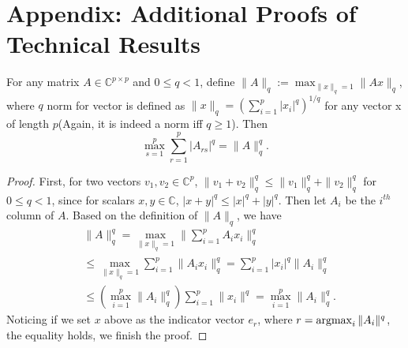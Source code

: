 \section{Appendix: Additional Proofs of Technical Results}\label{Appendix:proof_technical_lemmas}
\label{sec:proof_for_technical_lemmas}

\begin{lem}
\label{lemma:q_norm_eq}
For any matrix $A\in \mathbb{C}^{p \times p}$ and  $0\le q<1$, define $\|A\|_q:= \max_{\|x\|_q=1} \|Ax\|_q$, where $q$ norm for vector is defined as $\|x\|_q= (\sum_{i=1}^p |x_i|^q)^{1/q}$ for any vector x of length $p$(Again, it is indeed a norm iff $q\ge 1$). Then 
\begin{equation}
\max_{s=1}^p  \sum_{r=1}^p |A_{rs}|^q = \|A\|_q^q. \nonumber
\end{equation}
\begin{proof}
First, for two vectors $v_1, v_2\in \mathbb{C}^p$, $\|v_1+v_2\|_q^q\le \|v_1\|_q^q + \|v_2\|_q^q$ for $0\le q<1$, since for scalars $x,y\in \mathbb{C}$, $|x+y|^q \le |x|^q+|y|^q$. Then let $A_i$ be the $i^{th}$ column of $A$. Based on the definition of $\|A\|_q$, we have 
\begin{equation*}
\begin{aligned}
& \|A\|_q^q = \max_{\|x\|_q = 1} \|\sum_{i=1}^p A_ix_i\|_q^q \\
& \le  \max_{\|x\|_q = 1} \sum_{i=1}^p \|A_ix_i\|_q^q  = \sum_{i=1}^p |x_i|^q\|A_i\|_q^q\\
&\le (\max_{i=1}^p \|A_i\|_q^q) \sum_{i=1}^p\|x_i\|^q = \max_{i=1}^p \|A_i\|_q^q.
\end{aligned}
\end{equation*}
Noticing if we set $x$ above as the indicator vector $e_r$, where $r=\argmax_i \|A_i\|^q $, the equality holds, we finish the proof.  
\end{proof}
\end{lem}

